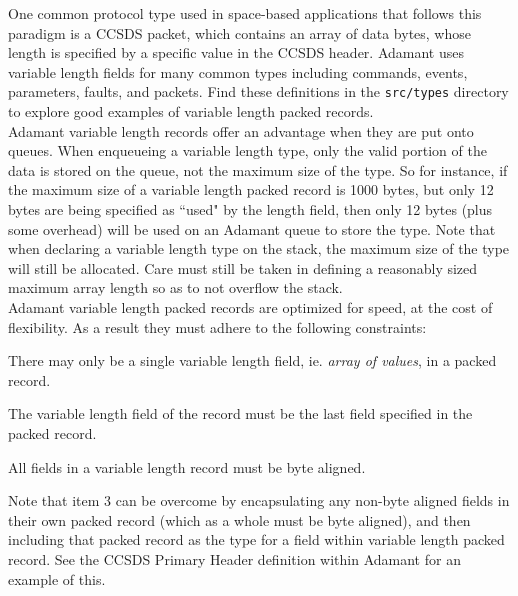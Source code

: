 One common protocol type used in space-based applications that follows this paradigm is a CCSDS packet, which contains an array of data bytes, whose length is specified by a specific value in the CCSDS header. Adamant uses variable length fields for many common types including commands, events, parameters, faults, and packets. Find these definitions in the \texttt{src/types} directory to explore good examples of variable length packed records. \\

Adamant variable length records offer an advantage when they are put onto queues. When enqueueing a variable length type, only the valid portion of the data is stored on the queue, not the maximum size of the type. So for instance, if the maximum size of a variable length packed record is 1000 bytes, but only 12 bytes are being specified as ``used" by the length field, then only 12 bytes (plus some overhead) will be used on an Adamant queue to store the type. Note that when declaring a variable length type on the stack, the maximum size of the type will still be allocated. Care must still be taken in defining a reasonably sized maximum array length so as to not overflow the stack. \\

Adamant variable length packed records are optimized for speed, at the cost of flexibility. As a result they must adhere to the following constraints:

\vspace{5mm} %
\begin{spacedenumerate}
  \item There may only be a single variable length field, ie. \textit{array of values}, in a packed record.
  \item The variable length field of the record must be the last field specified in the packed record.
  \item All fields in a variable length record must be byte aligned. 
\end{spacedenumerate}
\vspace{5mm} %

Note that item 3 can be overcome by encapsulating any non-byte aligned fields in their own packed record (which as a whole must be byte aligned), and then including that packed record as the type for a field within variable length packed record. See the CCSDS Primary Header definition within Adamant for an example of this. \\

